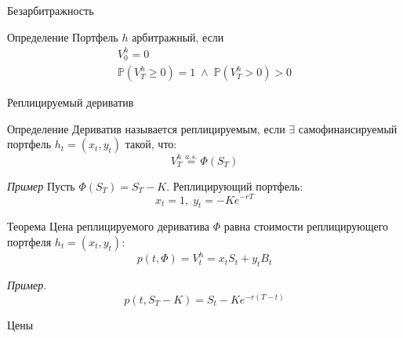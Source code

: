 \documentclass[aspectratio=169]{beamer}
\begin{document}
\begin{frame}{Безарбитражность}
    \begin{block}{Определение}
    Портфель $h$ арбитражный, если 
    $$
        \begin{gathered}
            V^h_0 = 0 \\
            \mathbb{P}(V^h_T \geq 0) = 1 \; \land \; 
            \mathbb{P}(V^h_T > 0) > 0
        \end{gathered}
    $$
    \end{block}

    
\end{frame}

\begin{frame}{Реплицируемый дериватив}
    \begin{block}{Определение}
        Дериватив называется реплицируемым, если $\exists$ самофинансируемый портфель $h_t=(x_t, y_t)$ такой, что:
        $$
            V_T^h \overset{a.s.}{=} \Phi(S_T)
        $$
    \end{block}
    \pause
    \textit{Пример} Пусть $\Phi(S_T) = S_T - K$. Реплицирующий портфель:
    $$
        x_t = 1, \; y_t = -K e^{-rT}
    $$
    \pause
    \begin{block}{Теорема}
        Цена реплицируемого дериватива $\Phi$ равна стоимости реплицирующего портфеля $h_t=(x_t, y_t)$:
        $$
            p(t, \Phi) = V_t^h = x_t S_t + y_t B_t
        $$
    \end{block}
    \pause
    \textit{Пример}.
    $$
        p(t, S_T - K) = S_t - K e^{-r(T-t)}
    $$
\end{frame}

\begin{frame}{Цены}
\end{frame}
\end{document}
